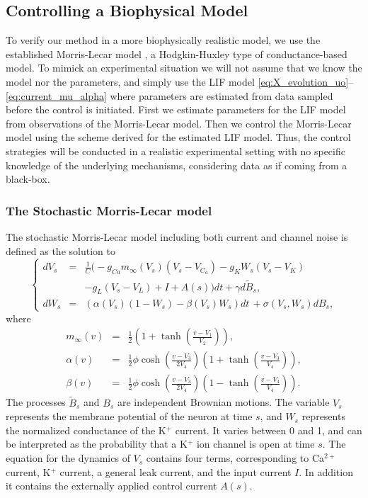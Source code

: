 \subsection{Controlling a Biophysical Model}
To verify our method in a more biophysically realistic model, we use
the established Morris-Lecar model \cite{MorrisLecar1981}, a
Hodgkin-Huxley type of conductance-based model. To mimick an
experimental situation we will not assume that we know the model nor
the parameters, and simply use the LIF model
\eqref{eq:X_evolution_uo}--\eqref{eq:current_mu_alpha} where
parameters 
are estimated from data sampled before the control is initiated. First we estimate parameters for the LIF
model from observations of the Morris-Lecar model. Then we control the Morris-Lecar
model using the scheme derived for the estimated LIF model. Thus, the
control strategies will be conducted in a realistic experimental
setting with no specific knowledge of the underlying mechanisms,
considering data as if coming from a black-box. 


\subsubsection{The Stochastic Morris-Lecar model}
\def \Vt {{ V_s }} \def \Wt {{ W_s }} \def \Vz {{ V_z}} \def \Wz {{ W_z}}

The stochastic Morris-Lecar model including both current and channel noise is
defined as the solution to
\begin{equation}
\left\{
\begin{array}{ccl}
d\Vt &=& \frac{1}{C}\Big(-g_{Ca}m_\infty(\Vt) (\Vt-V_{C_a}) - g_K\Wt(\Vt-V_K)
\\ && 
-g_L(\Vt-V_L)+I + A(s) \Big)dt +\gamma d\tilde{B}_s,\\
d\Wt&=&\left(\alpha(\Vt)(1-\Wt) - \beta(\Vt)\Wt\right) dt  \, + \sigma(\Vt,\Wt)dB_s,
\end{array}
\right.
\label{eq:ML}
\end{equation}
where 
\begin{eqnarray*}
m_\infty(v)&=&\frac{1}{2}\left(1+\tanh\left(\frac{v-V_1}{V_2}\right)\right),\\
\alpha(v) &=& \frac{1}{2}\phi \cosh\left(\frac{v-V_3}{2V_4}\right)\left(1+\tanh\left(\frac{v-V_3}{V_4}\right)\right),\\
\beta(v) &=& \frac{1}{2}\phi \cosh\left(\frac{v-V_3}{2V_4}\right)\left(1-\tanh\left(\frac{v-V_3}{V_4}\right)\right).
\end{eqnarray*}
The processes $\tilde{B}_s$ and $B_s$ are
independent Brownian motions. The variable $\Vt$ represents the membrane
potential of the neuron at time $s$, and $\Wt$ represents the normalized
conductance of the K$^+$ current. It varies between 0 and 1, and can be
interpreted as the probability that a K$^+$ ion channel is open at
time $s$. The 
equation for the dynamics of $V_s$ contains four terms,
corresponding to Ca$^{2+}$ current, K$^+$ current, a general leak
current, and the
input current $I$. In addition it contains the externally applied control
current $A(s)$.
   
